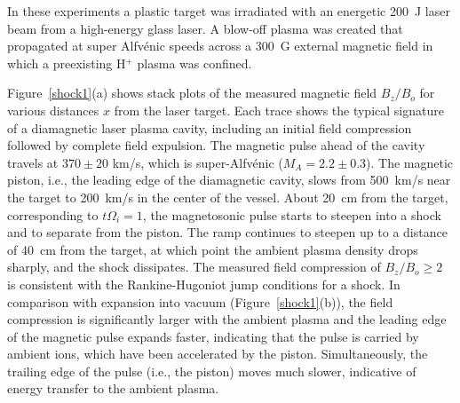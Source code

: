 \documentclass[11pt]{article}
\begin{document}
In these experiments a plastic target was irradiated with an energetic
200~J laser beam from a high-energy glass laser. A blow-off plasma
was created that propagated at super Alfv\'{e}nic speeds across a 300~G
external magnetic field in which a preexisting H$^+$ plasma was confined.


Figure~\ref{shock1}(a) shows stack plots of the measured magnetic field
$B_z/B_o$ for various
distances $x$ from the laser target. Each trace shows the typical
signature of a diamagnetic laser plasma cavity, including an initial
field compression followed by complete field expulsion. The magnetic
pulse ahead of the cavity travels at $370 \pm 20$ km/s, which is
super-Alfv\'{e}nic ($M_A = 2.2 \pm 0.3$). The magnetic
piston, i.e., the leading edge of the diamagnetic cavity, slows from
500~km/s near the target to 200~km/s in the center of the vessel. About 20~cm from the target, corresponding to
$t \Omega_{i} =1$, the magnetosonic pulse starts to
steepen into a shock and to separate from the piston. The ramp continues
to steepen up to a distance of 40~cm from the target, at which point the
ambient plasma density drops sharply, and the shock dissipates. 
The
measured field compression of $B_z/B_o \ge 2$ is consistent
with the Rankine-Hugoniot jump conditions for a shock. In comparison
with expansion into vacuum (Figure~\ref{shock1}(b)), the field compression is
significantly larger with the ambient plasma and the leading edge of the
magnetic pulse expands faster, indicating that the pulse is carried by
ambient ions, which have been accelerated by the piston. Simultaneously,
the trailing edge of the pulse (i.e., the piston) moves much slower,
indicative of energy transfer to the ambient plasma. 
\end{document}
